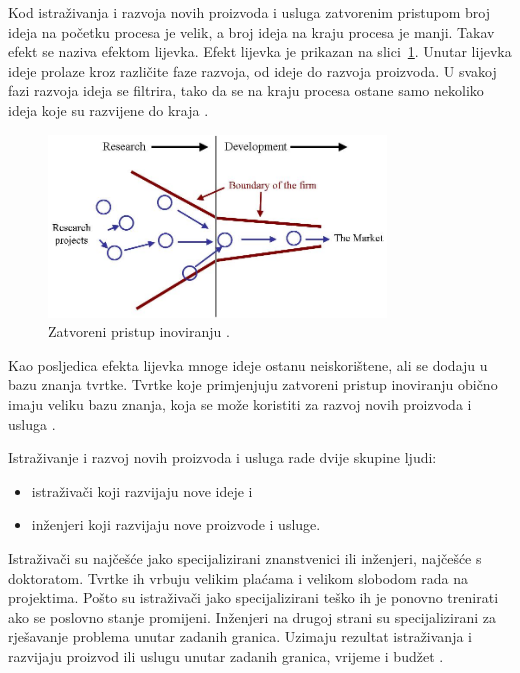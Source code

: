 Kod istraživanja i razvoja novih proizvoda i usluga zatvorenim pristupom broj
ideja na početku procesa je velik, a broj ideja na kraju procesa je manji. Takav
efekt se naziva efektom lijevka. Efekt lijevka je prikazan na
slici~\ref{fig:closed_inovations_funnel}. Unutar lijevka ideje prolaze kroz
različite faze razvoja, od ideje do razvoja proizvoda. U svakoj fazi razvoja
ideja se filtrira, tako da se na kraju procesa ostane samo nekoliko ideja koje
su razvijene do kraja \citep{zatvorenaotvorena2020,openinnovation2003}.

\begin{figure} 
    \centering
    \includegraphics[width=0.8\textwidth]{images/closed_inovations_funnel.jpg}
    \caption{Zatvoreni pristup inoviranju \citep{openinnovation2016}.}\label{fig:closed_inovations_funnel}
\end{figure}

Kao posljedica efekta lijevka mnoge ideje ostanu neiskorištene, ali se dodaju u
bazu znanja tvrtke. Tvrtke koje primjenjuju zatvoreni pristup inoviranju obično
imaju veliku bazu znanja, koja se može koristiti za razvoj novih proizvoda i
usluga \citep{zatvorenaotvorena2020,openinnovation2003}.

Istraživanje i razvoj novih proizvoda i usluga rade dvije skupine ljudi:
\begin{itemize}
    \item istraživači koji razvijaju nove ideje i
    \item inženjeri koji razvijaju nove proizvode i usluge.
\end{itemize}
Istraživači su najčešće jako specijalizirani znanstvenici ili inženjeri,
najčešće s doktoratom. Tvrtke ih vrbuju velikim plaćama i velikom slobodom rada
na projektima. Pošto su istraživači jako specijalizirani teško ih je ponovno
trenirati ako se poslovno stanje promijeni. Inženjeri na drugoj strani su
specijalizirani za rješavanje problema unutar zadanih granica. Uzimaju rezultat
istraživanja i razvijaju proizvod ili uslugu unutar zadanih granica, vrijeme i
budžet \citep{openinnovation2003}.
